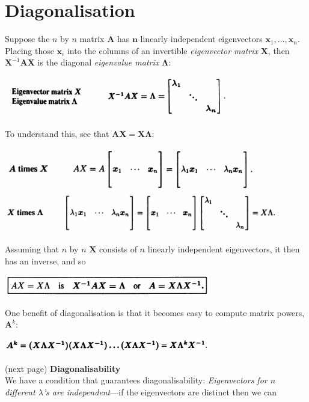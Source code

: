 \documentclass{report}
\begin{document}
\section{Diagonalisation}
Suppose the $n$ by $n$ matrix $\bm A$ has $\bm n$ linearly independent eigenvectors $\bm x_1,\ldots,\bm x_n$. Placing those $\bm x_i$ into the columns of an invertible
\textit{eigenvector matrix} $\bm X$, then $\bm X^{-1}\bm{AX}$ is the diagonal \textit{eigenvalue matrix} $\bm\Lambda$:
\begin{center}
\includegraphics[width=10cm]{114}
\end{center}
To understand this, see that $\bm{AX}=\bm{X\Lambda}$:
\begin{center}
\includegraphics[width=11cm]{115}\\
\includegraphics[width=12cm]{116}
\end{center}
Assuming that $n$ by $n$ $\bm X$ consists of $n$ linearly independent eigenvectors, it then has an inverse, and so
\begin{center}
\includegraphics[width=9cm]{117}
\end{center}
One benefit of diagonalisation is that it becomes easy to compute matrix powers, $\bm A^k$:
\begin{center}
\includegraphics[width=9cm]{118}
\end{center}
(next page)\newpage
\noindent\textbf{Diagonalisability}\\
We have a condition that guarantees diagonalisability: \textit{Eigenvectors for $n$ different $\lambda$'s are independent}---if the eigenvectors are distinct then we can
\end{document}
